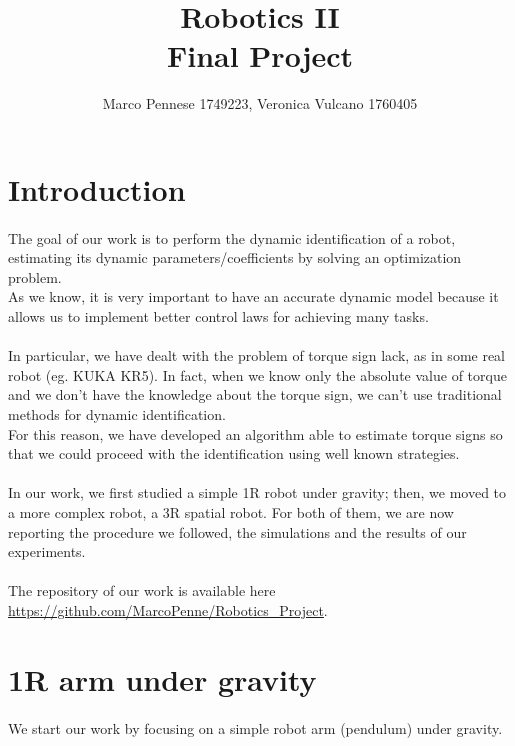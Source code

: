 \documentclass{article}
\title{\textbf{Robotics II} \\ \large{\textbf{Final Project}}}
\author{Marco Pennese 1749223, Veronica Vulcano 1760405}
\date{}
\begin{document}
\maketitle
\tableofcontents
\pagebreak

\section{Introduction}
\paragraph{}The goal of our work is to perform the dynamic identification of a robot, estimating its dynamic parameters/coefficients by solving an optimization problem.\\
As we know, it is very important to have an accurate dynamic model because it allows us to implement better control laws for achieving many tasks.\\\\
In particular, we have dealt with the problem of torque sign lack, as in some real robot (eg. KUKA KR5). In fact, when we know only the absolute value of torque and we don't have the knowledge about the torque sign, we can't use traditional methods for dynamic identification.\\
For this reason, we have developed an algorithm able to estimate torque signs so that we could proceed with the identification using well known strategies.
\paragraph{}In our work, we first studied a simple 1R robot under gravity; then, we moved to a more complex robot, a 3R spatial robot. For both of them, we are now reporting the procedure we followed, the simulations and the results of our experiments.\\\\

The repository of our work is available here \url{https://github.com/MarcoPenne/Robotics_Project}.

\section{1R arm under gravity}
\paragraph{}We start our work by focusing on a simple robot arm (pendulum) under gravity.
\end{document}
